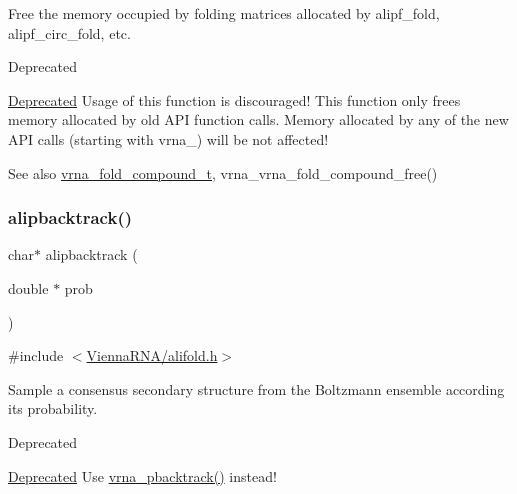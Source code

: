 Free the memory occupied by folding matrices allocated by alipf\+\_\+fold, alipf\+\_\+circ\+\_\+fold, etc. 

\begin{DoxyRefDesc}{Deprecated}
\item[\mbox{\hyperlink{deprecated__deprecated000022}{Deprecated}}]Usage of this function is discouraged! This function only free\textquotesingle{}s memory allocated by old A\+PI function calls. Memory allocated by any of the new A\+PI calls (starting with vrna\+\_\+) will be not affected!\end{DoxyRefDesc}


\begin{DoxySeeAlso}{See also}
\mbox{\hyperlink{group__fold__compound_ga1b0cef17fd40466cef5968eaeeff6166}{vrna\+\_\+fold\+\_\+compound\+\_\+t}}, vrna\+\_\+vrna\+\_\+fold\+\_\+compound\+\_\+free() 
\end{DoxySeeAlso}
\mbox{\label{group__part__func__global__deprecated_ga0df40248788f0fb17ebdc59d74116d1c}} 
\subsubsection{\texorpdfstring{alipbacktrack()}{alipbacktrack()}}
{\footnotesize\ttfamily char$\ast$ alipbacktrack (\begin{DoxyParamCaption}\item[{double $\ast$}]{prob }\end{DoxyParamCaption})}



{\ttfamily \#include $<$\mbox{\hyperlink{alifold_8h}{Vienna\+R\+N\+A/alifold.\+h}}$>$}



Sample a consensus secondary structure from the Boltzmann ensemble according its probability. 

\begin{DoxyRefDesc}{Deprecated}
\item[\mbox{\hyperlink{deprecated__deprecated000023}{Deprecated}}]Use \mbox{\hyperlink{group__subopt__stochbt_ga594844ac73c4e66e00d6791b31540634}{vrna\+\_\+pbacktrack()}} instead!\end{DoxyRefDesc}



